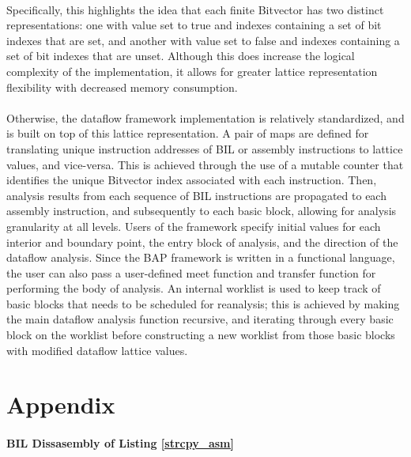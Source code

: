 \documentclass[letterpaper,11pt]{article}
\begin{document}
\paragraph{}
Specifically, this highlights the idea that each finite Bitvector has two
distinct representations: one with value set to true and indexes containing a
set of bit indexes that are set, and another with value set to false and
indexes containing a set of bit indexes that are unset. Although this does
increase the logical complexity of the implementation, it allows for greater
lattice representation flexibility with decreased memory consumption.

\paragraph{}
Otherwise, the dataflow framework implementation is relatively standardized,
and is built on top of this lattice representation. A pair of maps are defined
for translating unique instruction addresses of BIL or assembly instructions to
lattice values, and vice-versa. This is achieved through the use of a mutable
counter that identifies the unique Bitvector index associated with each
instruction. Then, analysis results from each sequence of BIL instructions are
propagated to each assembly instruction, and subsequently to each basic block,
allowing for analysis granularity at all levels. Users of the framework specify
initial values for each interior and boundary point, the entry block of
analysis, and the direction of the dataflow analysis. Since the BAP framework
is written in a functional language, the user can also pass a user-defined meet
function and transfer function for performing the body of analysis. An internal
worklist is used to keep track of basic blocks that needs to be scheduled for
reanalysis; this is achieved by making the main dataflow analysis function
recursive, and iterating through every basic block on the worklist before
constructing a new worklist from those basic blocks with modified dataflow
lattice values.

\section{Appendix}
\label{appa2}
\paragraph{BIL Dissasembly of Listing \ref{strcpy_asm}}
\end{document}
